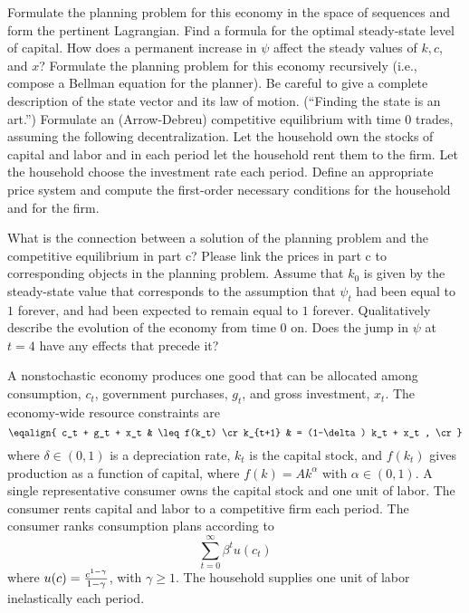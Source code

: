 \medskip
{}  Formulate the planning problem for this economy  in the space of
sequences and form the pertinent Lagrangian.  Find a formula for the optimal steady-state level of capital.
How does a permanent  increase in  $\psi$ affect the steady values of
$k, c$, and $x$?
\medskip
{} Formulate the planning problem for this economy recursively
(i.e., compose a Bellman equation for the planner).  Be careful to give a complete
description of the state vector and its law  of motion.  (``Finding the state
is an art.'')
\medskip
{}  Formulate an (Arrow-Debreu) competitive equilibrium
with time $0$ trades, assuming the following decentralization.
Let the household  own the stocks of capital and labor and in each period
 let the household rent them to the firm.  Let the household choose
the investment rate each period.  Define an appropriate price system and compute
the first-order necessary conditions for the household and for the firm.

\medskip
{} What is the connection between a solution of the planning
problem and the competitive equilibrium in part c?
Please link the prices in part c to corresponding objects
in the planning problem.
\medskip
{}  Assume
that $k_0$ is given by the steady-state value that corresponds
to  the assumption that $\psi_t$ had been
equal to $1$ forever, and had been expected to remain equal to $1$ forever.
Qualitatively
describe the evolution of the economy from time $0$ on.   Does the jump in $\psi$ at
$t=4$ have any effects that precede it?


\medskip
{}  \medskip
\medskip
\noindent
A  nonstochastic economy produces one good that can be allocated among consumption, $c_t$, government purchases, $g_t$,  and gross investment, $x_t$.
The economy-wide resource constraints are
$$\eqalign{ c_t + g_t + x_t & \leq f(k_t) \cr
    k_{t+1} & = (1-\delta) k_t + x_t , \cr }$$
where $\delta \in (0,1)$ is a depreciation rate,  $k_t$ is the capital stock, and $f(k_t)$ gives production as a function of capital, where
 $f(k) = A k^\alpha$ with $\alpha  \in (0,1)$.  A single representative consumer owns the capital stock and one unit of labor.
 The consumer rents capital and labor to a competitive firm each period.  The consumer ranks consumption plans according to
 $$ \sum_{t=0}^\infty \beta^t u(c_t) $$
 where $u(c) = {c^{1-\gamma}\over 1-\gamma}$, with $\gamma \geq 1$.  The household supplies one unit of labor inelastically each period.

